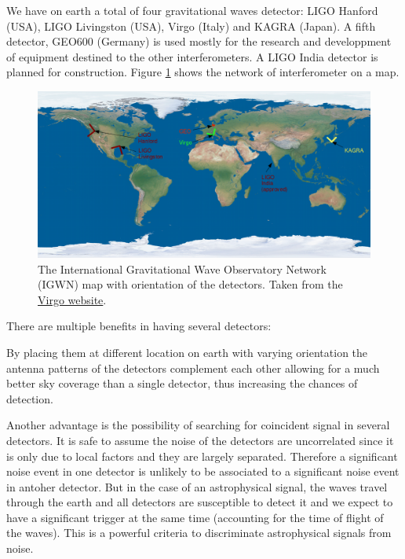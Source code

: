 We have on earth a total of four gravitational waves detector: LIGO Hanford (USA), LIGO Livingston (USA), Virgo (Italy) and KAGRA (Japan).
A fifth detector, GEO600 (Germany) is used mostly for the research and developpment of equipment destined to the other interferometers.
A LIGO India detector is planned for construction.
Figure \ref{fig:igwn} shows the network of interferometer on a map.
%
\begin{figure}
  \centering
  \includegraphics[width=0.5\linewidth]{sectionDetection/itf_network.png}
  \caption{The International Gravitational Wave Observatory Network (IGWN) map with orientation of the detectors. Taken from the \href{http://public.virgo-gw.eu/a-worldwide-network/}{Virgo website}.}
  \label{fig:igwn}
\end{figure}
%
There are multiple benefits in having several detectors:

By placing them at different location on earth with varying orientation the antenna patterns of the detectors complement each other allowing for a much better sky coverage than a single detector, thus increasing the chances of detection.

Another advantage is the possibility of searching for coincident signal in several detectors.
It is safe to assume the noise of the detectors are uncorrelated since it is only due to local factors and they are largely separated.
Therefore a significant noise event in one detector is unlikely to be associated to a significant noise event in antoher detector.
But in the case of an astrophysical signal, the waves travel through the earth and all detectors are susceptible to detect it and we expect to have a significant trigger at the same time (accounting for the time of flight of the waves).
This is a powerful criteria to discriminate astrophysical signals from noise.

